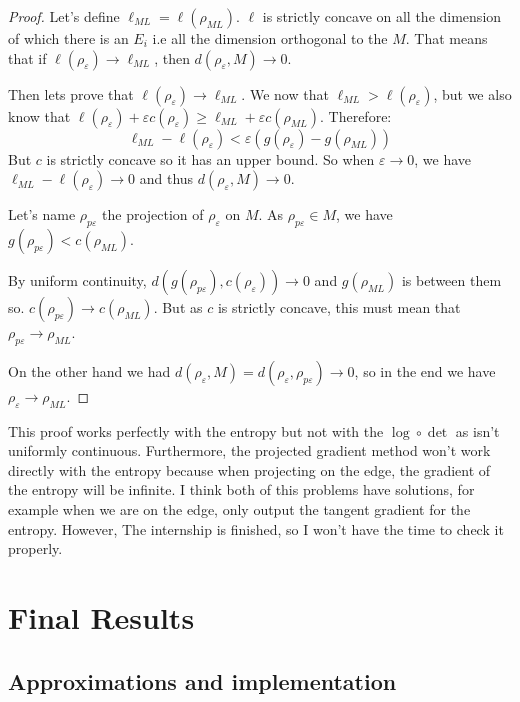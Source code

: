 \documentclass[10pt,a4paper]{report}
\theoremstyle{plain}
\theoremstyle{definition}
\theoremstyle{remark}
\renewcommand{\geq}{\geqslant}
\newcommand{\ml}{_{M\!L}}
\begin{document}
\begin{proof}
  Let's define $\ell\ml = \ell(\rho\ml)$.
  $\ell$ is strictly concave on all the dimension of which there is an $E_i$
  i.e all the dimension orthogonal to the $M$. That means that if
  $\ell(\rho_\varepsilon) \to \ell\ml$, then $d(\rho_\varepsilon,M) \to 0$.

  Then lets prove that $\ell(\rho_\varepsilon) \to \ell\ml$. We now that
  $\ell\ml > \ell(\rho_\varepsilon)$, but we also know that
  $\ell(\rho_\varepsilon) + \varepsilon c(\rho_\varepsilon) \geq \ell\ml +
  \varepsilon c(\rho\ml)$. Therefore:
  \[\ell\ml - \ell(\rho_\varepsilon) < \varepsilon (g(\rho_\varepsilon) - g(\rho\ml))\]
  But $c$ is strictly concave so it has an upper bound. So when $\varepsilon \to
  0$, we have $\ell\ml - \ell(\rho_\varepsilon) \to 0$ and thus
  $d(\rho_\varepsilon,M)\to 0$.

  Let's name $\rho_{p\varepsilon}$ the projection of $\rho_\varepsilon$ on $M$.
  As $\rho_{p\varepsilon} \in M$, we have $g(\rho_{p\varepsilon}) < c(\rho\ml)$.

  By uniform continuity, $d(g(\rho_{p\varepsilon}),c(\rho_\varepsilon)) \to 0$
  and $g(\rho\ml)$ is between them so. $c(\rho_{p\varepsilon}) \to c(\rho\ml)$.
  But as $c$ is strictly concave, this must mean that $\rho_{p\varepsilon} \to
  \rho\ml$.

  On the other hand we had $d(\rho_\varepsilon,M) =
  d(\rho_\varepsilon,\rho_{p\varepsilon}) \to 0$, so in the end we have
  $\rho_\varepsilon \to \rho\ml$.
\end{proof}

This proof works perfectly with the entropy but not with the $\log \circ \det$
as isn't uniformly continuous. Furthermore, the projected gradient method won't
work directly with the entropy because when projecting on the edge, the gradient of the
entropy will be infinite. I think both of this problems have solutions, for
example when we are on the edge, only output the tangent gradient for the
entropy. However, The internship is finished, so I won't have the time to check
it properly.


\chapter{Final Results}

\section{Approximations and implementation}
\end{document}
